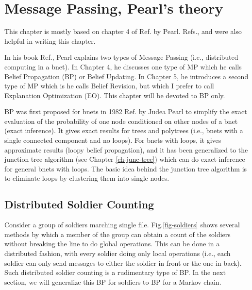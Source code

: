 \chapter{Message Passing, Pearl's theory}
\label{ch-mpass}

This chapter is mostly
based on chapter 4 of
Ref.\cite{pearl-1988book}
by Pearl.
Refs.\cite{wiki-mp},
and \cite{neapolitan2004learning}
were also helpful in writing this chapter.

In his book Ref.\cite{pearl-1988book},
Pearl explains two types
of Message Passing (i.e., distributed
computing in a bnet). In Chapter 4, he discusses
one type of MP which he calls Belief Propagation (BP)
or Belief Updating. In Chapter 5, he introduces
a second type of MP which is he calls Belief Revision, but
which I prefer to call
Explanation Optimization (EO).
This chapter will be devoted to BP only.


BP
was first proposed for bnets in 1982
Ref.\cite{pearl1982reverend} by Judea Pearl
to simplify
the exact evaluation of the probability
of one node conditioned
on other nodes
of a bnet (exact inference).
It gives exact results for trees and
polytrees (i.e., bnets with
a single connected component and
 no
loops). For bnets with loops,
it gives approximate results
(loopy belief propagation),
and it has been generalized to
the junction tree algorithm
(see Chapter \ref{ch-junc-tree})
which can do exact inference
for general bnets with loops.
The basic idea behind
the junction tree algorithm
is to eliminate
loops by clustering
them into single nodes.



\section{Distributed Soldier Counting}
Consider
a group of soldiers marching single file.
Fig.\ref{fig-soldiers}
shows several methods by which
a member of the group
can obtain a count
of the soldiers without
breaking the line to do
global operations.
This can be done in
a distributed fashion,
with every soldier doing
only local operations
(i.e.,
each soldier
can only
send
messages
to either
the soldier in front
or the one in
back).
Such
distributed soldier counting is a rudimentary
type of BP.
In the next section,
we will
generalize this BP for soldiers
to BP for a Markov chain.
\newpage



